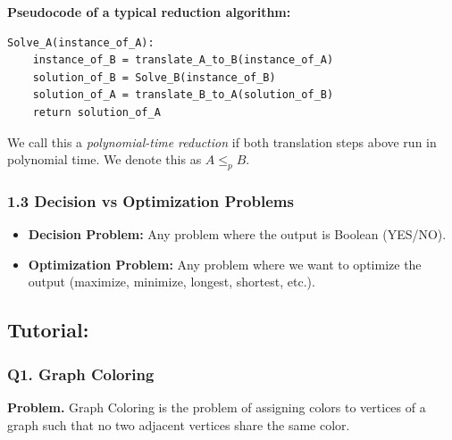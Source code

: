 \documentclass[9pt]{extarticle}
\begin{document}
\textbf{Pseudocode of a typical reduction algorithm:}
\begin{verbatim}
Solve_A(instance_of_A):
    instance_of_B = translate_A_to_B(instance_of_A)
    solution_of_B = Solve_B(instance_of_B)
    solution_of_A = translate_B_to_A(solution_of_B)
    return solution_of_A
\end{verbatim}

We call this a \emph{polynomial-time reduction} if both translation steps above run in polynomial time.  
We denote this as \( A \leq_p B \).

\subsubsection*{1.3 Decision vs Optimization Problems}

\begin{itemize}
    \item \textbf{Decision Problem:} Any problem where the output is Boolean (YES/NO).
    \item \textbf{Optimization Problem:} Any problem where we want to optimize the output (maximize, minimize, longest, shortest, etc.).
\end{itemize}
\subsection{Tutorial:}
\subsubsection{Q1. Graph Coloring}

\textbf{Problem.}  
Graph Coloring is the problem of assigning colors to vertices of a graph such that no two adjacent vertices share the same color.
\end{document}
